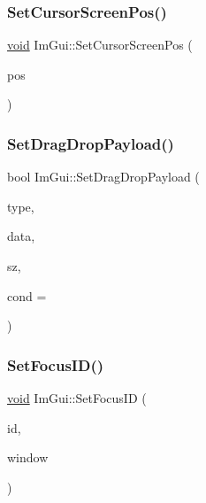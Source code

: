 \subsubsection{\texorpdfstring{Set\+Cursor\+Screen\+Pos()}{SetCursorScreenPos()}}
{\footnotesize\ttfamily \hyperlink{imgui__impl__opengl3__loader_8h_ac668e7cffd9e2e9cfee428b9b2f34fa7}{void} Im\+Gui\+::\+Set\+Cursor\+Screen\+Pos (\begin{DoxyParamCaption}\item[{const \hyperlink{structImVec2}{Im\+Vec2} \&}]{pos }\end{DoxyParamCaption})}

\mbox{\label{namespaceImGui_a45f9694c878e79127c63d20d8955e07f}} 
\subsubsection{\texorpdfstring{Set\+Drag\+Drop\+Payload()}{SetDragDropPayload()}}
{\footnotesize\ttfamily bool Im\+Gui\+::\+Set\+Drag\+Drop\+Payload (\begin{DoxyParamCaption}\item[{const char $\ast$}]{type,  }\item[{const \hyperlink{imgui__impl__opengl3__loader_8h_ac668e7cffd9e2e9cfee428b9b2f34fa7}{void} $\ast$}]{data,  }\item[{size\+\_\+t}]{sz,  }\item[{Im\+Gui\+Cond}]{cond = {} }\end{DoxyParamCaption})}

\mbox{\label{namespaceImGui_a8ad578d7141486ff12b59b0c251234e6}} 
\subsubsection{\texorpdfstring{Set\+Focus\+I\+D()}{SetFocusID()}}
{\footnotesize\ttfamily \hyperlink{imgui__impl__opengl3__loader_8h_ac668e7cffd9e2e9cfee428b9b2f34fa7}{void} Im\+Gui\+::\+Set\+Focus\+ID (\begin{DoxyParamCaption}\item[{Im\+Gui\+ID}]{id,  }\item[{\hyperlink{structImGuiWindow}{Im\+Gui\+Window} $\ast$}]{window }\end{DoxyParamCaption})}

